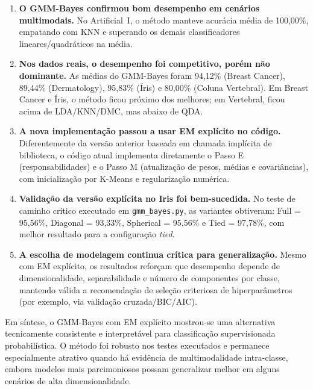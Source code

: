 \begin{enumerate}
 
  \item \textbf{O GMM-Bayes confirmou bom desempenho em cenários multimodais.}
  No Artificial~I, o método manteve acurácia média de 100,00\%, empatando com KNN e
  superando os demais classificadores lineares/quadráticos na média.
 
  \item \textbf{Nos dados reais, o desempenho foi competitivo, porém não dominante.}
  As médias do GMM-Bayes foram 94,12\% (Breast Cancer), 89,44\% (Dermatology),
  95,83\% (Íris) e 80,00\% (Coluna Vertebral). Em Breast Cancer e Íris, o método ficou
  próximo dos melhores; em Vertebral, ficou acima de LDA/KNN/DMC, mas abaixo de QDA.
 
  \item \textbf{A nova implementação passou a usar EM explícito no código.}
  Diferentemente da versão anterior baseada em chamada implícita de biblioteca, o código
  atual implementa diretamente o Passo E (responsabilidades) e o Passo M (atualização de
  pesos, médias e covariâncias), com inicialização por K-Means e regularização numérica.
 
  \item \textbf{Validação da versão explícita no Iris foi bem-sucedida.}
  No teste de caminho crítico executado em \texttt{gmm\_bayes.py}, as variantes obtiveram:
  Full = 95,56\%, Diagonal = 93,33\%, Spherical = 95,56\% e Tied = 97,78\%, com melhor
  resultado para a configuração \emph{tied}.
 
  \item \textbf{A escolha de modelagem continua crítica para generalização.}
  Mesmo com EM explícito, os resultados reforçam que desempenho depende de dimensionalidade,
  separabilidade e número de componentes por classe, mantendo válida a recomendação de
  seleção criteriosa de hiperparâmetros (por exemplo, via validação cruzada/BIC/AIC).
 
\end{enumerate}
 
Em síntese, o GMM-Bayes com EM explícito mostrou-se uma alternativa tecnicamente consistente
e interpretável para classificação supervisionada probabilística. O método foi robusto nos
testes executados e permanece especialmente atrativo quando há evidência de multimodalidade
intra-classe, embora modelos mais parcimoniosos possam generalizar melhor em alguns cenários
de alta dimensionalidade.
